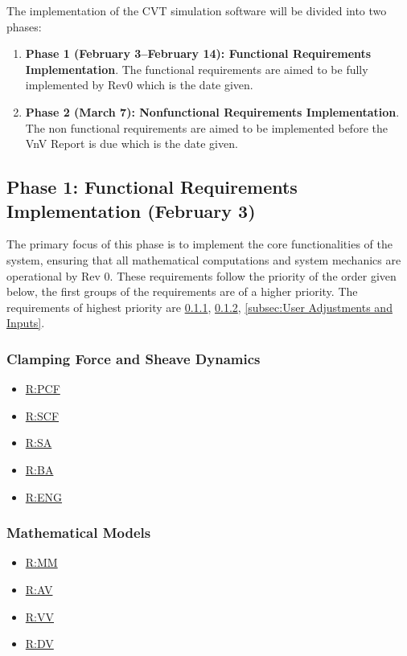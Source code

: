 \documentclass[12pt]{article}
\newcommand{\hpref}[1]{\hyperref[#1]{#1}}
\begin{document}
  The implementation of the CVT simulation software will be divided into two phases:
  \begin{enumerate}
      \item \textbf{Phase 1 (February 3–February 14): Functional Requirements Implementation}. The functional requirements are aimed to be fully implemented by Rev0 which is the date given. 
      \item \textbf{Phase 2 (March 7): Nonfunctional Requirements Implementation}. The non functional requirements are aimed to be implemented before the VnV Report is due which is the date given. 
  \end{enumerate}
  
  \subsection{Phase 1: Functional Requirements Implementation (February 3)}
  
  The primary focus of this phase is to implement the core functionalities of the system, ensuring that all mathematical computations and system mechanics are operational by Rev 0.
  These requirements follow the priority of the order given below, the first groups of the requirements are of a higher priority. 
  The requirements of highest priority are \ref{subsec:Clamping Force and Sheave Dynamics}, \ref{subsec:Mathematical Models}, \ref{subsec:User Adjustments and Inputs}. 
  
  \subsubsection{Clamping Force and Sheave Dynamics}
  \label{subsec:Clamping Force and Sheave Dynamics}
  \begin{itemize}
      \item \hpref{R:PCF}
      \item \hpref{R:SCF}
      \item \hpref{R:SA}
      \item \hpref{R:BA}
      \item \hpref{R:ENG}
  \end{itemize}

  \subsubsection{Mathematical Models}
  \label{subsec:Mathematical Models}
  \begin{itemize}
       \item \hpref{R:MM}
       \item \hpref{R:AV}
       \item \hpref{R:VV}
       \item \hpref{R:DV}
  \end{itemize}
  
\end{document}
